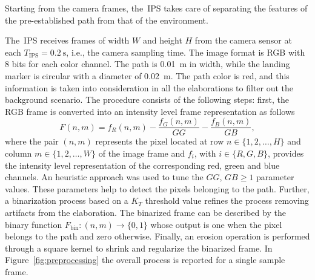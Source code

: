 Starting from the camera frames, the~\gls{IPS} takes care of separating the features of the pre-established path from that of the environment. %

The~\gls{IPS} receives frames of width $W$ and height $H$ from the camera sensor at each   $T_\mathrm{IPS} = \SI{0.2}{\second}$, i.e., the camera sampling time. The image format is RGB with $8$ bits for each color channel. The path is \SI{0.01}{\meter} in width, while the landing marker is circular with a diameter of \SI{0.02}{\meter}. The path color is red, and this information is taken into consideration in all the elaborations to filter out the background scenario. The procedure consists of the following steps: first, the RGB frame is converted into an intensity level frame representation as follows 
%
\begin{equation}
	F(n,m)=f_R(n,m) -  \frac{f_G(n,m)}{GG} - \frac{f_B(n,m)}{GB} ,
\end{equation}
%
where the pair $(n,m)$ represents the pixel located at row $n \in \{1, 2, \dots, H\}$ and column $m \in \{1, 2, \dots, W\}$ of the image frame and $f_i$, with $i \in \{R, G, B\}$, provides the intensity level representation of the corresponding red, green and blue channels. An heuristic approach was used to tune the $GG$, $GB \geq 1$ parameter values. These parameters help to detect the pixels belonging to the path. Further, a binarization process based on a $K_T$  threshold value refines the process removing artifacts from the elaboration. The binarized frame can be described by the binary function $F_\mathrm{bin} \colon (n,m) \to \{0, 1\}$ whose output is one when the pixel belongs to the path and zero otherwise. Finally, an erosion operation is performed through a square kernel to shrink and regularize the binarized frame. In Figure~\ref{fig:preprocessing} the overall process is reported for a single sample frame.

